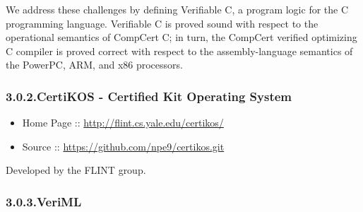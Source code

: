 \documentclass[12pt,twoside]{article}
\begin{document}
\noindent{}We address these challenges by defining Verifiable C, a program logic
for the C programming language. Verifiable C is proved sound with
respect to the operational semantics of CompCert C; in turn, the
CompCert verified optimizing C compiler is proved correct with respect
to the assembly-language semantics of the PowerPC, ARM, and x86
processors.%

\subsubsection{3.0.2.\hspace*{0.5em}CertiKOS - Certified Kit Operating System}\label{sec-certikos---certified-kit-operating-system}%

\begin{itemize}[noitemsep,topsep=\mdcompacttopsep]%

\item{}Home Page :: \href{http://flint.cs.yale.edu/certikos/}{{\ttfamily http://\hspace{0pt}flint.\hspace{0pt}cs.\hspace{0pt}yale.\hspace{0pt}edu/\hspace{0pt}certikos/\hspace{0pt}}}%

\item{}Source :: \href{https://github.com/npe9/certikos.git}{{\ttfamily https://\hspace{0pt}github.\hspace{0pt}com/\hspace{0pt}npe9/\hspace{0pt}certikos.\hspace{0pt}git}}%
\end{itemize}%

\noindent{}Developed by the FLINT group.%

\subsubsection{3.0.3.\hspace*{0.5em}VeriML}\label{sec-veriml}%
\end{document}

